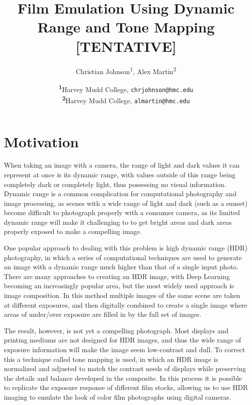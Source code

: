 \documentclass[
	a4paper, %
	10pt, %
	unnumberedsections, %
	twoside, %
]{LTJournalArticle}
\title{Film Emulation Using Dynamic Range and Tone Mapping [TENTATIVE]} %
\author{%
	Christian Johnson\textsuperscript{1}, Alex Martin\textsuperscript{2} 
}
\date{\footnotesize\textsuperscript{\textbf{1}}Harvey Mudd College, \texttt{chrjohnson@hmc.edu} \\ \textsuperscript{\textbf{2}}Harvey Mudd College, \texttt{almartin@hmc.edu}}
\begin{document}
\maketitle %


\section{Motivation}

When taking an image with a camera, the range of light and dark values it can represent at once is its dynamic range, with values outside of this range being completely dark or completely light, thus possessing no visual information. Dynamic range is a common complication for computational photography and image processing, as scenes with a wide range of light and dark (such as a sunset) become difficult to photograph properly with a consumer camera, as its limited dynamic range will make it challenging to to get bright areas and dark areas properly exposed to make a compelling image.

One popular approach to dealing with this problem is high dynamic range (HDR) photography, in which a series of computational techniques are used to generate an image with a dynamic range much higher than that of a single input photo. There are many approaches to creating an HDR image, with Deep Learning becoming an increasingly popular area, but the most widely used approach is image composition. In this method multiple images of the same scene are taken at different exposures, and then digitally combined to create a single image where areas of under/over exposure are filled in by the full set of images.

The result, however, is not yet a compelling photograph. Most displays and printing mediums are not designed for HDR images, and thus the wide range of exposure information will make the image seem low-contrast and dull. To correct this a technique called tone mapping is used, in which an HDR image is normalized and adjusted to match the contrast needs of displays while preserving the details and balance developed in the composite. In this process it is possible to replicate the exposure response of different film stocks, allowing us to use HDR imaging to emulate the look of color film photographs using digital cameras.
\end{document}
